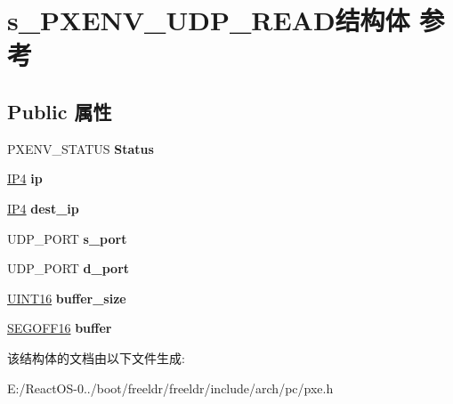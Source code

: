 \hypertarget{structs___p_x_e_n_v___u_d_p___r_e_a_d}{}\section{s\+\_\+\+P\+X\+E\+N\+V\+\_\+\+U\+D\+P\+\_\+\+R\+E\+A\+D结构体 参考}
\label{structs___p_x_e_n_v___u_d_p___r_e_a_d}
\subsection*{Public 属性}
\begin{DoxyCompactItemize}
\item 
\mbox{\label{structs___p_x_e_n_v___u_d_p___r_e_a_d_a6d28a585d9cdad2d696d2f73a47b80d6}} 
P\+X\+E\+N\+V\+\_\+\+S\+T\+A\+T\+US {\bfseries Status}
\item 
\mbox{\label{structs___p_x_e_n_v___u_d_p___r_e_a_d_a75042f2b237f0a3ac303b0223d10450b}} 
\hyperlink{union_i_p4}{I\+P4} {\bfseries ip}
\item 
\mbox{\label{structs___p_x_e_n_v___u_d_p___r_e_a_d_a8a0af556bf33c5b872d531d994e9b99a}} 
\hyperlink{union_i_p4}{I\+P4} {\bfseries dest\+\_\+ip}
\item 
\mbox{\label{structs___p_x_e_n_v___u_d_p___r_e_a_d_a298879f88c7df8e4bbb02a7597219b61}} 
U\+D\+P\+\_\+\+P\+O\+RT {\bfseries s\+\_\+port}
\item 
\mbox{\label{structs___p_x_e_n_v___u_d_p___r_e_a_d_a77268de4344f50949c61f72be7409406}} 
U\+D\+P\+\_\+\+P\+O\+RT {\bfseries d\+\_\+port}
\item 
\mbox{\label{structs___p_x_e_n_v___u_d_p___r_e_a_d_ade445bfa283a057c3c139a636d679c59}} 
\hyperlink{_processor_bind_8h_a09f1a1fb2293e33483cc8d44aefb1eb1}{U\+I\+N\+T16} {\bfseries buffer\+\_\+size}
\item 
\mbox{\label{structs___p_x_e_n_v___u_d_p___r_e_a_d_ad090755b39618d21a2757b0be6c0ead4}} 
\hyperlink{structs___s_e_g_o_f_f16}{S\+E\+G\+O\+F\+F16} {\bfseries buffer}
\end{DoxyCompactItemize}


该结构体的文档由以下文件生成\+:\begin{DoxyCompactItemize}
\item 
E\+:/\+React\+O\+S-\/0../boot/freeldr/freeldr/include/arch/pc/pxe.\+h\end{DoxyCompactItemize}
